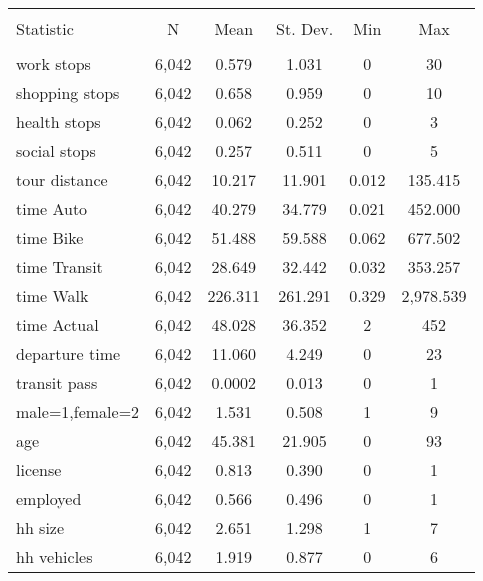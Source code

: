 \begin{table}[!htbp] \centering \tiny
\label{fig:descriptives}
  
\begin{tabular}{@{\extracolsep{5pt}}lccccc} 
	 
\\[-1.8ex]\hline 
\hline \\[-1.8ex] 
Statistic & \multicolumn{1}{c}{N} & \multicolumn{1}{c}{Mean} & \multicolumn{1}{c}{St. Dev.} & \multicolumn{1}{c}{Min} & \multicolumn{1}{c}{Max} \\ 
\hline \\[-1.8ex] 
 
work stops & 6,042 & 0.579 & 1.031 & 0 & 30 \\ 


shopping stops & 6,042 & 0.658 & 0.959 & 0 & 10 \\ 
health stops & 6,042 & 0.062 & 0.252 & 0 & 3 \\ 
social stops & 6,042 & 0.257 & 0.511 & 0 & 5 \\ 


tour distance & 6,042 & 10.217 & 11.901 & 0.012 & 135.415 \\ 
time Auto & 6,042 & 40.279 & 34.779 & 0.021 & 452.000 \\ 
time Bike & 6,042 & 51.488 & 59.588 & 0.062 & 677.502 \\ 
time Transit & 6,042 & 28.649 & 32.442 & 0.032 & 353.257 \\ 
time Walk & 6,042 & 226.311 & 261.291 & 0.329 & 2,978.539 \\ 
time Actual & 6,042 & 48.028 & 36.352 & 2 & 452 \\ 
 
departure time & 6,042 & 11.060 & 4.249 & 0 & 23 \\ 
 
transit pass & 6,042 & 0.0002 & 0.013 & 0 & 1 \\ 
 
 

 

male=1,female=2 & 6,042 & 1.531 & 0.508 & 1 & 9 \\ 
age & 6,042 & 45.381 & 21.905 & 0 & 93 \\ 



license & 6,042 & 0.813 & 0.390 & 0 & 1 \\ 
employed & 6,042 & 0.566 & 0.496 & 0 & 1 \\ 
 
 
hh size & 6,042 & 2.651 & 1.298 & 1 & 7 \\ 
hh vehicles & 6,042 & 1.919 & 0.877 & 0 & 6 \\ 


\end{tabular}
\end{table}
